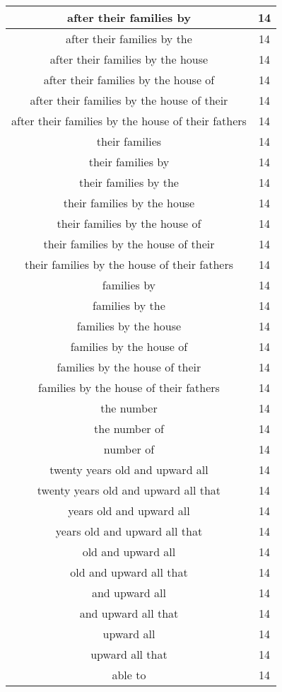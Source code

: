 \begin{center}
\begin{longtable}{|c|c|}
after their families by & 14\\ \hline 
after their families by the & 14\\ \hline 
after their families by the house & 14\\ \hline 
after their families by the house of & 14\\ \hline 
after their families by the house of their & 14\\ \hline 
after their families by the house of their fathers & 14\\ \hline 
their families & 14\\ \hline 
their families by & 14\\ \hline 
their families by the & 14\\ \hline 
their families by the house & 14\\ \hline 
their families by the house of & 14\\ \hline 
their families by the house of their & 14\\ \hline 
their families by the house of their fathers & 14\\ \hline 
families by & 14\\ \hline 
families by the & 14\\ \hline 
families by the house & 14\\ \hline 
families by the house of & 14\\ \hline 
families by the house of their & 14\\ \hline 
families by the house of their fathers & 14\\ \hline 
the number & 14\\ \hline 
the number of & 14\\ \hline 
number of & 14\\ \hline 
twenty years old and upward all & 14\\ \hline 
twenty years old and upward all that & 14\\ \hline 
years old and upward all & 14\\ \hline 
years old and upward all that & 14\\ \hline 
old and upward all & 14\\ \hline 
old and upward all that & 14\\ \hline 
and upward all & 14\\ \hline 
and upward all that & 14\\ \hline 
upward all & 14\\ \hline 
upward all that & 14\\ \hline 
able to & 14\\ \hline 

\end{longtable}
\end{center}
